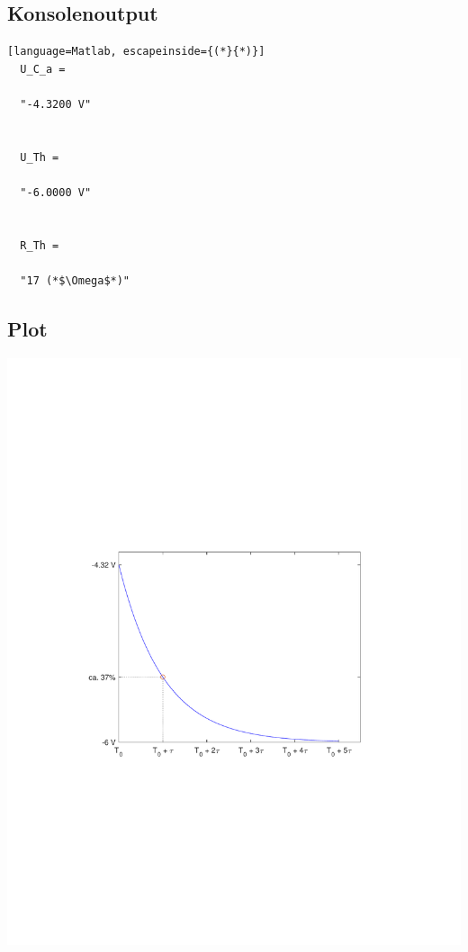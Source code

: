 \documentclass[11pt]{scrartcl}
\begin{document}
\subsection{Konsolenoutput}
\begin{lstlisting}[language=Matlab, escapeinside={(*}{*)}]
  U_C_a =

  "-4.3200 V"


  U_Th =

  "-6.0000 V"


  R_Th =

  "17 (*$\Omega$*)"
\end{lstlisting}

\subsection{Plot}
\begin{center}
  \includegraphics[scale=1]{./Assets/u_C_plot.pdf}
  \label{fig:umschalt}
\end{center}
\end{document}
